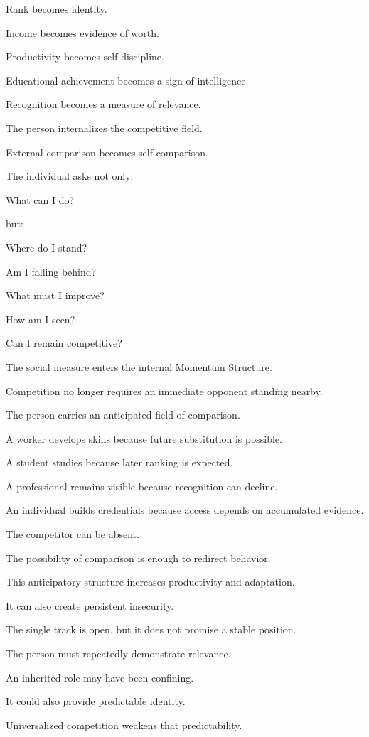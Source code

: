 Rank becomes identity.

Income becomes evidence of worth.

Productivity becomes self-discipline.

Educational achievement becomes a sign of intelligence.

Recognition becomes a measure of relevance.

The person internalizes the competitive field.

External comparison becomes self-comparison.

The individual asks not only:

What can I do?

but:

Where do I stand?

Am I falling behind?

What must I improve?

How am I seen?

Can I remain competitive?

The social measure enters the internal Momentum Structure.

Competition no longer requires an immediate opponent standing nearby.

The person carries an anticipated field of comparison.

A worker develops skills because future substitution is possible.

A student studies because later ranking is expected.

A professional remains visible because recognition can decline.

An individual builds credentials because access depends on accumulated evidence.

The competitor can be absent.

The possibility of comparison is enough to redirect behavior.

This anticipatory structure increases productivity and adaptation.

It can also create persistent insecurity.

The single track is open, but it does not promise a stable position.

The person must repeatedly demonstrate relevance.

An inherited role may have been confining.

It could also provide predictable identity.

Universalized competition weakens that predictability.

